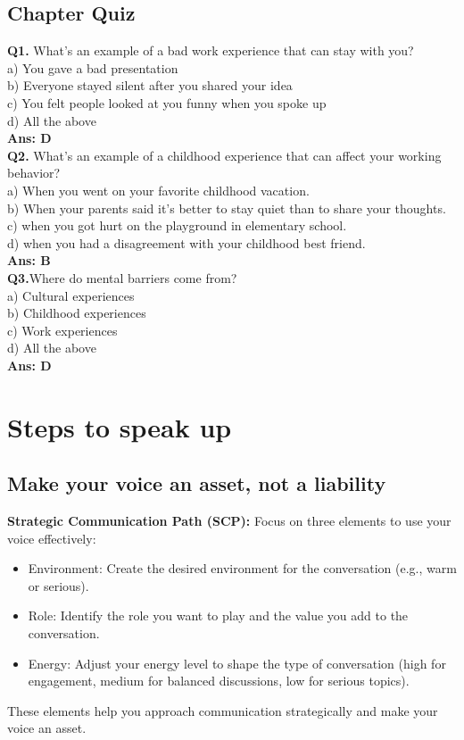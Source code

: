 \documentclass[12pt]{article}
\begin{document}
\subsection{Chapter Quiz}
\textbf{Q1.} What's an example of a bad work experience that can stay with you?\\
a) You gave a bad presentation\\
 b) Everyone stayed silent after you shared your idea \\
 c) You felt people looked at you funny when you spoke up\\
 d) All the above\\
\textbf{Ans: D}\\
\textbf{Q2.} What's an example of a childhood experience that can affect your working behavior?\\
a) When you went on your favorite childhood vacation.\\
b) When your parents said it's better to stay quiet than to share your thoughts.\\
c) when you got hurt on the playground in elementary school.\\
d) when you had a disagreement with your childhood best friend.\\
\textbf{Ans: B}\\
\textbf{Q3.}Where do mental barriers come from?\\
a) Cultural experiences \\
b) Childhood experiences \\
c) Work experiences\\
d) All the above\\
\textbf{Ans: D}\\


\section{ Steps to speak up}

\subsection{Make your voice an asset, not a liability}
\textbf{Strategic Communication Path (SCP):} Focus on three elements to use your voice effectively:\\
\begin{itemize}
\item{Environment: Create the desired environment for the conversation (e.g., warm or serious).}
\item{Role: Identify the role you want to play and the value you add to the conversation.}
\item{Energy: Adjust your energy level to shape the type of conversation (high for engagement, medium for balanced discussions, low for serious topics).}\\
\end{itemize}
These elements help you approach communication strategically and make your voice an asset.
\end{document}
